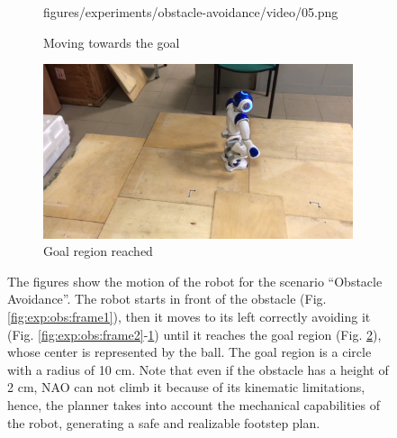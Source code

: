 \begin{figure}
\begin{subfigure}{0.48\textwidth}
      {figures/experiments/obstacle-avoidance/video/05.png}
    \caption{Moving towards the goal}
    \label{fig:exp:obs:frame5}
  \end{subfigure}\hspace*{\fill}
  \begin{subfigure}{0.48\textwidth}
    \includegraphics[width=\linewidth]
      {figures/experiments/obstacle-avoidance/video/06.png}
    \caption{Goal region reached}
    \label{fig:exp:obs:frame6}
  \end{subfigure}
  \caption{The figures show the motion of the robot for the scenario
      ``Obstacle Avoidance''. The robot starts in front of the obstacle
      (Fig. \ref{fig:exp:obs:frame1}), then it moves to its left correctly
      avoiding it (Fig. \ref{fig:exp:obs:frame2}-\ref{fig:exp:obs:frame5})
      until it reaches the goal region (Fig. \ref{fig:exp:obs:frame6}),
      whose center is represented by 
      the ball. The goal region is a circle with a radius of 10 cm. 
      Note that even if the obstacle has a height of 2 cm, NAO can not climb it 
      because of its kinematic limitations, hence, the planner takes
      into account the mechanical capabilities of the robot, generating a 
      safe and realizable footstep plan.}
  \label{fig:experiments:obstacle-avoidance:videoframes}
\end{figure}

